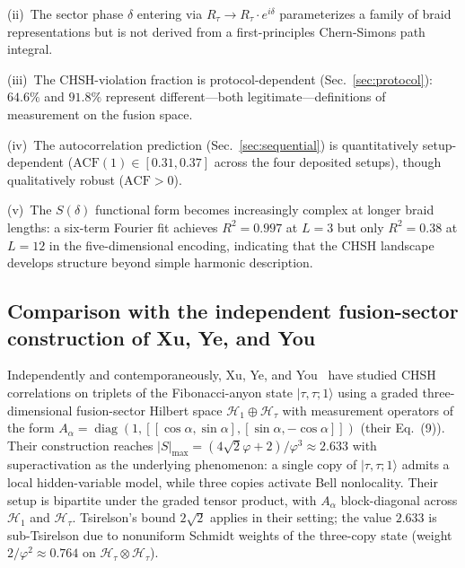 \documentclass[aps,pra,twocolumn,superscriptaddress,longbibliography,floatfix,nofootinbib]{revtex4-2}
\begin{document}
(ii)~The sector phase $\delta$ entering via
$R_\tau\to R_\tau\cdot e^{i\delta}$ parameterizes a family of
braid representations but is not derived from a first-principles
Chern-Simons path integral.

(iii)~The CHSH-violation fraction is protocol-dependent
(Sec.~\ref{sec:protocol}): $64.6\%$ and $91.8\%$ represent
different---both legitimate---definitions of measurement on the
fusion space.

(iv)~The autocorrelation prediction (Sec.~\ref{sec:sequential}) is
quantitatively setup-dependent ($\text{ACF}(1)\in [0.31,0.37]$
across the four deposited setups),
though qualitatively robust ($\text{ACF}>0$).

(v)~The $S(\delta)$ functional form becomes increasingly complex
at longer braid lengths: a six-term Fourier fit achieves
$R^2=0.997$ at $L=3$ but only $R^2=0.38$ at $L=12$ in the
five-dimensional encoding, indicating that the CHSH landscape
develops structure beyond simple harmonic description.

\subsection{Comparison with the independent fusion-sector construction of Xu, Ye, and You}
\label{sec:xuyeyou_comparison}

Independently and contemporaneously, Xu, Ye, and You~\cite{Xu2025}
have studied CHSH correlations on triplets of the Fibonacci-anyon
state $|\tau,\tau;1\rangle$ using a graded three-dimensional
fusion-sector Hilbert space $\mathcal{H}_1 \oplus \mathcal{H}_\tau$
with measurement operators of the form $A_\alpha = \operatorname{diag}(1,
[[\cos\alpha,\sin\alpha],[\sin\alpha,-\cos\alpha]])$ (their Eq.~(9)).
Their construction reaches
$|S|_{\max} = (4\sqrt{2}\varphi + 2)/\varphi^3 \approx 2.633$
with superactivation as the underlying phenomenon: a single copy of
$|\tau,\tau;1\rangle$ admits a local hidden-variable model, while three
copies activate Bell nonlocality. Their setup is bipartite under the
graded tensor product, with $A_\alpha$ block-diagonal across
$\mathcal{H}_1$ and $\mathcal{H}_\tau$. Tsirelson's bound $2\sqrt{2}$
applies in their setting; the value $2.633$ is sub-Tsirelson due to
nonuniform Schmidt weights of the three-copy state
(weight $2/\varphi^2 \approx 0.764$ on $\mathcal{H}_\tau \otimes \mathcal{H}_\tau$).
\end{document}

